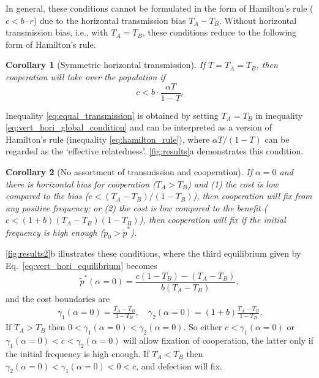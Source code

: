 \documentclass[12pt]{extarticle}
\newtheorem{corollary}{Corollary}
\begin{document}
{In general, these conditions cannot be formulated in the form of Hamilton's rule ($c<b\cdot r$) due to the horizontal transmission bias $T_A-T_B$.
Without horizontal transmission bias, i.e., with $T_A=T_B$, these conditions reduce to the following  form of Hamilton's rule.\\

\begin{corollary}[Symmetric horizontal transmission]
If $T=T_A=T_B$, then cooperation will take over the population if
\begin{equation}
\label{eq:equal_transmission}
c < b \cdot \frac{\alpha T}{1-T}.
\end{equation}
\end{corollary}
Inequality \ref{eq:equal_transmission} is obtained by setting $T_A=T_B$ in inequality \ref{eq:vert_hori_global_condition} and can be interpreted as a version of Hamilton's rule (inequality \ref{eq:hamilton_rule}), where $\alpha T/(1-T)$ can be regarded as the `effective relatedness'.
\autoref{fig:results}a demonstrates this condition. 
\\

\begin{corollary}[No assortment of transmission and cooperation]
If $\alpha=0$ and there is horizontal bias for cooperation ($T_A>T_B$) and
(1) the cost is low compared to the bias ($c<(T_A-T_B)/(1-T_B)$), then cooperation will fix from any positive frequency; or
(2) the cost is low compared to the benefit ($c<(1+b)(T_A-T_B)(1-T_B)$), then cooperation will fix if the initial frequency is high enough ($\tilde{p}_0 > \tilde{p}^*$).
\end{corollary}

\autoref{fig:results2}b illustrates these conditions, where
 the third equilibrium given by Eq.\ \ref{eq:vert_hori_equilibrium} becomes
\begin{equation} \label{eq:vert_hori_alpha0_equilibrium}
\tilde{p}^*(\alpha=0) = \frac{c(1-T_B) - (T_A-T_B)}{b (T_A-T_B) },
\end{equation} 
and the cost boundaries are
\begin{equation}\begin{aligned}
\gamma_1(\alpha=0) = \frac{T_A - T_B}{1-T_B}, \quad
\gamma_2(\alpha=0) = (1+b)\frac{T_A - T_B}{1-T_B}.
\end{aligned}\end{equation}
If $T_A>T_B$ then $0<\gamma_1(\alpha=0)<\gamma_2(\alpha=0)$.
So either $c<\gamma_1(\alpha=0)$ or $\gamma_1(\alpha=0)<c<\gamma_2(\alpha=0)$ will allow fixation of cooperation, the latter only if the initial frequency is high enough.
If $T_A<T_B$ then $\gamma_2(\alpha=0)<\gamma_1(\alpha=0)<0<c$,
and defection will fix.
\\

}
\end{document}
